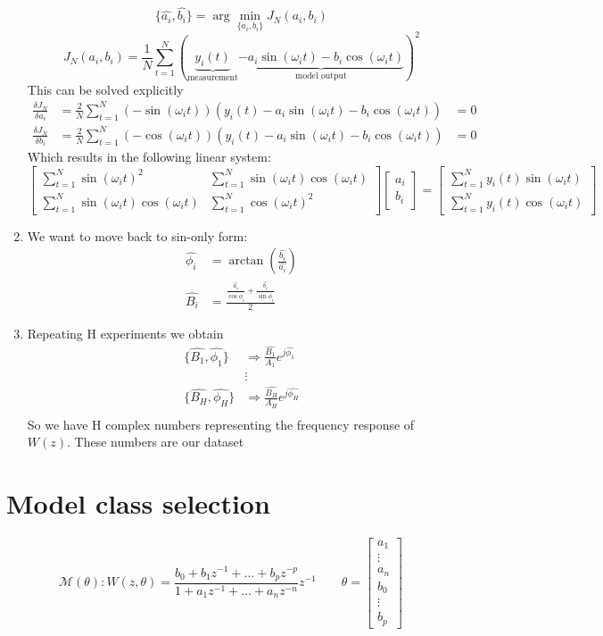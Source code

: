\documentclass{report}
\begin{document}
\begin{enumerate}
\[
\{\hat{a_i},\hat{b_i}\}=\arg\min_{\{a_i,b_i\}} J_N(a_i,b_i)
\]
\[
J_N(a_i,b_i)=\frac{1}{N}\sum_{t=1}^{N} \left( 
\underbrace{
	y_i(t)
}_{
	\text{measurement}
}
\underbrace{
	-a_i\sin(\omega_it)
	-b_i\cos(\omega_it)
}_{
	\text{model output}
}
\right)^2
\]
This can be solved explicitly
\begin{align*}
\frac{\delta J_N}{\delta a_i}&=
\frac{2}{N}\sum_{t=1}^N
\left(-\sin(\omega_it)\right)
\left(y_i(t)-a_i\sin(\omega_it)-b_i\cos(\omega_it)\right)&=0\\
\frac{\delta J_N}{\delta b_i}&=
\frac{2}{N}\sum_{t=1}^N
\left(-\cos(\omega_it)\right)
\left(y_i(t)-a_i\sin(\omega_it)-b_i\cos(\omega_it)\right)&=0
\end{align*}
Which results in the following linear system:
\[
\begin{bmatrix}
\sum_{t=1}^N \sin(\omega_it)^2
&
\sum_{t=1}^N \sin(\omega_it)\cos(\omega_it)
\\
\sum_{t=1}^N \sin(\omega_it)\cos(\omega_it)
&
\sum_{t=1}^N \cos(\omega_it)^2
\end{bmatrix}
\begin{bmatrix}
a_i\\b_i
\end{bmatrix}
=
\begin{bmatrix}
\sum_{t=1}^N y_i(t)\sin(\omega_it)
\\
\sum_{t=1}^N y_i(t)\cos(\omega_it)
\end{bmatrix}
\]
\item We want to move back to sin-only form:
\begin{align*}
\hat{\phi_i}&=\arctan \left(\frac{\hat{b_i}}{\hat{a_i}}\right)\\
\hat{B_i}&=\frac{\frac{\hat{a_i}}{\cos\hat{\phi_i}}+\frac{\hat{b_i}}{\sin\hat{\phi_i}}}{2}
\end{align*}
\item Repeating H experiments we obtain
\begin{align*}
\{\hat{B_1},\hat{\phi_1}\} &\Rightarrow \frac{\hat{B_1}}{A_1}e^{j\hat{\phi_1}}\\
&\vdots\\
\{\hat{B_H},\hat{\phi_H}\} &\Rightarrow \frac{\hat{B_H}}{A_H}e^{j\hat{\phi_H}}\\
\end{align*}
So we have H complex numbers representing the frequency response of $W(z)$. These numbers are our dataset
\end{enumerate}
\section{Model class selection}
\[
\mathcal{M(\theta)}:
W(z,\theta)=
\frac{b_0+b_1z^{-1}+\dots+b_pz^{-p}}{1+a_1z^{-1}+\dots+a_nz^{-n}}
z^{-1}
\qquad
\theta=\begin{bmatrix}
a_1\\\vdots\\a_n\\b_0\\\vdots\\b_p
\end{bmatrix}
\]
\end{document}
